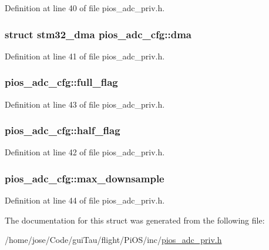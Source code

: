 Definition at line 40 of file pios\-\_\-adc\-\_\-priv.\-h.

\hypertarget{structpios__adc__cfg_a290c06e429c8f00e3047f4d3583fc08e}{
\subsubsection[{dma}]{\setlength{\rightskip}{0pt plus 5cm}struct {\bf stm32\-\_\-dma} pios\-\_\-adc\-\_\-cfg\-::dma}}\label{structpios__adc__cfg_a290c06e429c8f00e3047f4d3583fc08e}


Definition at line 41 of file pios\-\_\-adc\-\_\-priv.\-h.

\hypertarget{structpios__adc__cfg_aab7eae753f1347fc6092b34a49109cac}{
\subsubsection[{full\-\_\-flag}]{ pios\-\_\-adc\-\_\-cfg\-::full\-\_\-flag}}\label{structpios__adc__cfg_aab7eae753f1347fc6092b34a49109cac}


Definition at line 43 of file pios\-\_\-adc\-\_\-priv.\-h.

\hypertarget{structpios__adc__cfg_a51e37a0e22f7eebdf167c3bfe3454178}{
\subsubsection[{half\-\_\-flag}]{ pios\-\_\-adc\-\_\-cfg\-::half\-\_\-flag}}\label{structpios__adc__cfg_a51e37a0e22f7eebdf167c3bfe3454178}


Definition at line 42 of file pios\-\_\-adc\-\_\-priv.\-h.

\hypertarget{structpios__adc__cfg_af589b8712695ad7294d4e9f94007b241}{
\subsubsection[{max\-\_\-downsample}]{ pios\-\_\-adc\-\_\-cfg\-::max\-\_\-downsample}}\label{structpios__adc__cfg_af589b8712695ad7294d4e9f94007b241}


Definition at line 44 of file pios\-\_\-adc\-\_\-priv.\-h.



The documentation for this struct was generated from the following file\-:\begin{DoxyCompactItemize}
\item 
/home/jose/\-Code/gui\-Tau/flight/\-Pi\-O\-S/inc/\hyperlink{pios__adc__priv_8h}{pios\-\_\-adc\-\_\-priv.\-h}\end{DoxyCompactItemize}
